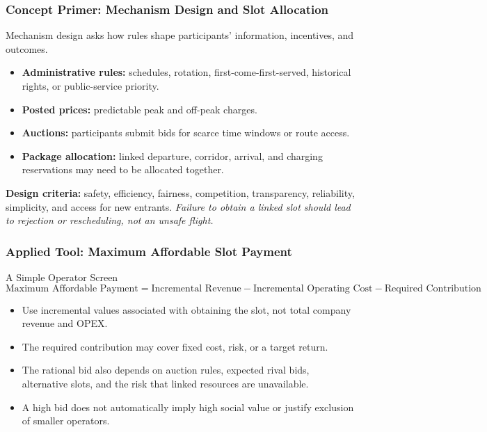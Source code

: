 \documentclass{beamer}
\begin{document}
\begin{frame}[t]
\frametitle{Concept Primer: Mechanism Design and Slot Allocation}
Mechanism design asks how rules shape participants' information, incentives, and outcomes.
\begin{itemize}
\item \textbf{Administrative rules:} schedules, rotation, first-come-first-served, historical rights, or public-service priority.
\item \textbf{Posted prices:} predictable peak and off-peak charges.
\item \textbf{Auctions:} participants submit bids for scarce time windows or route access.
\item \textbf{Package allocation:} linked departure, corridor, arrival, and charging reservations may need to be allocated together.
\end{itemize}
\textbf{Design criteria:} safety, efficiency, fairness, competition, transparency, reliability, simplicity, and access for new entrants.
\textit{Failure to obtain a linked slot should lead to rejection or rescheduling, not an unsafe flight.}
\end{frame}

\begin{frame}[t]
\frametitle{Applied Tool: Maximum Affordable Slot Payment}
\begin{block}{A Simple Operator Screen}
\[
\text{Maximum Affordable Payment}
=
\text{Incremental Revenue}
-\text{Incremental Operating Cost}
-\text{Required Contribution}
\]
\end{block}
\begin{itemize}
\item Use incremental values associated with obtaining the slot, not total company revenue and OPEX.
\item The required contribution may cover fixed cost, risk, or a target return.
\item The rational bid also depends on auction rules, expected rival bids, alternative slots, and the risk that linked resources are unavailable.
\item A high bid does not automatically imply high social value or justify exclusion of smaller operators.
\end{itemize}
\end{frame}
\end{document}

